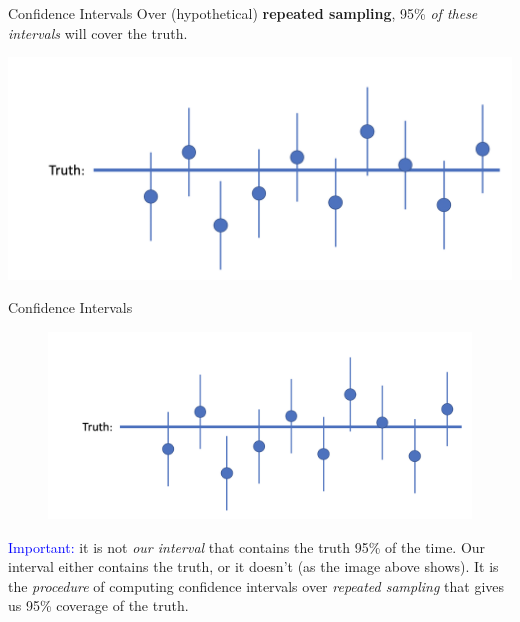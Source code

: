 \documentclass[10pt,t]{beamer}
\begin{document}
\begin{frame}{Confidence Intervals}
Over (hypothetical) \textbf{repeated sampling}, 95\% \textit{of these intervals} will cover the truth.

\centering \includegraphics[scale=0.4]{ci6.png}

\end{frame}

\begin{frame}{Confidence Intervals}

\begin{figure}
\centering \includegraphics[scale=0.4]{ci6.png}
\end{figure}

\vspace{0.3cm}

\textcolor{blue}{Important:} it is not \textit{our interval} that contains the truth 95\% of the time. Our interval either contains the truth, or it doesn't (as the image above shows). It is the \textit{procedure} of computing confidence intervals over \textit{repeated sampling} that gives us 95\% coverage of the truth.

\end{frame}
\end{document}
